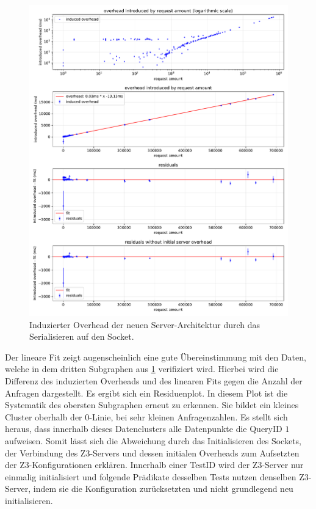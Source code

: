 \begin{figure}[!htp]
    \centering
    \includegraphics[scale=.55]{./PerformanceEvaluation/overhead.pdf}
    \caption{Induzierter Overhead der neuen Server-Architektur durch das Serialisieren auf den Socket.}
    \label{fig:overhead}
\end{figure}

Der lineare Fit zeigt augenscheinlich eine gute Übereinstimmung mit den Daten, welche in dem dritten Subgraphen aus \cref{fig:overhead} verifiziert wird.
Hierbei wird die Differenz des induzierten Overheads und des linearen Fits gegen die Anzahl der Anfragen dargestellt.
Es ergibt sich ein Residuenplot.
In diesem Plot ist die Systematik des obersten Subgraphen erneut zu erkennen.
Sie bildet ein kleines Cluster oberhalb der $0$-Linie, bei sehr kleinen Anfragenzahlen.
Es stellt sich heraus, dass innerhalb dieses Datenclusters alle Datenpunkte die QueryID $1$ aufweisen.
Somit lässt sich die Abweichung durch das Initialisieren des Sockets, der Verbindung des Z3-Servers und dessen initialen Overheads zum Aufsetzten der Z3-Konfigurationen erklären.
Innerhalb einer TestID wird der Z3-Server nur einmalig initialisiert und folgende Prädikate desselben Tests nutzen denselben Z3-Server, indem sie die Konfiguration zurücksetzten und nicht grundlegend neu initialisieren.

